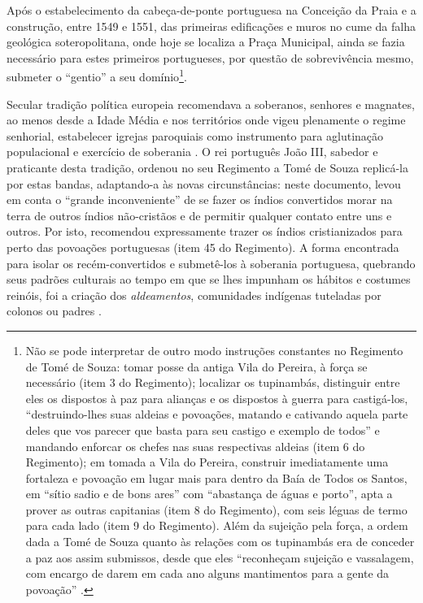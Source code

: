 Após o estabelecimento da cabeça-de-ponte portuguesa na Conceição da Praia e a construção, entre 1549 e 1551, das primeiras edificações e muros no cume da falha geológica soteropolitana, onde hoje se localiza a Praça Municipal, ainda se fazia necessário para estes primeiros portugueses, por questão de sobrevivência mesmo, submeter o ``gentio'' a seu domínio\footnote{Não se pode interpretar de outro modo instruções constantes no Regimento de Tomé de Souza: tomar posse da antiga Vila do Pereira, à força se necessário (item 3 do Regimento); localizar os tupinambás, distinguir entre eles os dispostos à paz para alianças e os dispostos à guerra para castigá-los, ``destruindo-lhes suas aldeias e povoações, matando e cativando aquela parte deles que vos parecer que basta para seu castigo e exemplo de todos'' e mandando enforcar os chefes nas suas respectivas aldeias (item 6 do Regimento); em tomada a Vila do Pereira, construir imediatamente uma fortaleza e povoação em lugar mais para dentro da Baía de Todos os Santos, em ``sítio sadio e de bons ares'' com ``abastança de águas e porto'', apta a prover as outras capitanias (item 8 do Regimento), com seis léguas de termo para cada lado (item 9 do Regimento). Além da sujeição pela força, a ordem dada a Tomé de Souza quanto às relações com os tupinambás era de conceder a paz aos assim submissos, desde que eles ``reconheçam sujeição e vassalagem, com encargo de darem em cada ano alguns mantimentos para a gente da povoação'' \cite[pp.~81-101]{ruy_politica_1949}.}.

Secular tradição política europeia recomendava a soberanos, senhores e magnates, ao menos desde a Idade Média e nos territórios onde vigeu plenamente o regime senhorial, estabelecer igrejas paroquiais como instrumento para aglutinação populacional e exercício de soberania \cite[pp.~193-205]{BERNARDO1997}. O rei português João III, sabedor e praticante desta tradição, ordenou no seu Regimento a Tomé de Souza replicá-la por estas bandas, adaptando-a às novas circunstâncias: neste documento, levou em conta o ``grande inconveniente'' de se fazer os índios convertidos morar na terra de outros índios não-cristãos e de permitir qualquer contato entre uns e outros. Por isto, recomendou expressamente trazer os índios cristianizados para perto das povoações portuguesas (item 45 do Regimento). A forma encontrada para isolar os recém-convertidos e submetê-los à soberania portuguesa, quebrando seus padrões culturais ao tempo em que se lhes impunham os hábitos e costumes reinóis, foi a criação dos \textit{aldeamentos}, comunidades indígenas tuteladas por colonos ou padres \cite[pp.~72-76]{santos_salvador_2004}.

